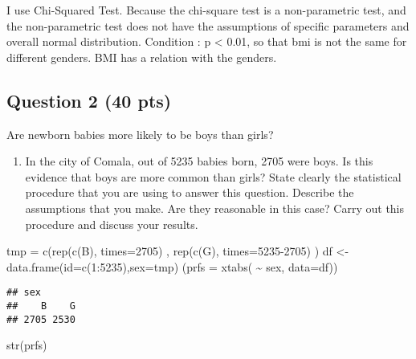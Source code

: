 \documentclass[
]{article}
\newenvironment{Shaded}{\begin{snugshade}}{\end{snugshade}}
\newcommand{\AttributeTok}[1]{\textcolor[rgb]{0.77,0.63,0.00}{#1}}
\newcommand{\DecValTok}[1]{\textcolor[rgb]{0.00,0.00,0.81}{#1}}
\newcommand{\FunctionTok}[1]{\textcolor[rgb]{0.00,0.00,0.00}{#1}}
\newcommand{\NormalTok}[1]{#1}
\newcommand{\OtherTok}[1]{\textcolor[rgb]{0.56,0.35,0.01}{#1}}
\newcommand{\SpecialCharTok}[1]{\textcolor[rgb]{0.00,0.00,0.00}{#1}}
\newcommand{\StringTok}[1]{\textcolor[rgb]{0.31,0.60,0.02}{#1}}
\providecommand{\tightlist}{%
  \setlength{\itemsep}{0pt}\setlength{\parskip}{0pt}}
\begin{document}
I use Chi-Squared Test. Because the chi-square test is a non-parametric
test, and the non-parametric test does not have the assumptions of
specific parameters and overall normal distribution. Condition : p
\textless{} 0.01, so that bmi is not the same for different genders. BMI
has a relation with the genders.

\hypertarget{question-2-40-pts}{%
\subsection{Question 2 (40 pts)}\label{question-2-40-pts}}

Are newborn babies more likely to be boys than girls?

\begin{enumerate}
\def\labelenumi{(\alph{enumi})}
\tightlist
\item
  In the city of Comala, out of 5235 babies born, 2705 were boys. Is
  this evidence that boys are more common than girls? State clearly the
  statistical procedure that you are using to answer this question.
  Describe the assumptions that you make. Are they reasonable in this
  case? Carry out this procedure and discuss your results.
\end{enumerate}

\begin{Shaded}
\begin{Highlighting}[]
\NormalTok{tmp }\OtherTok{=} \FunctionTok{c}\NormalTok{(}\FunctionTok{rep}\NormalTok{(}\FunctionTok{c}\NormalTok{(}\StringTok{\textquotesingle{}B\textquotesingle{}}\NormalTok{), }\AttributeTok{times=}\DecValTok{2705}\NormalTok{) , }\FunctionTok{rep}\NormalTok{(}\FunctionTok{c}\NormalTok{(}\StringTok{\textquotesingle{}G\textquotesingle{}}\NormalTok{), }\AttributeTok{times=}\DecValTok{5235{-}2705}\NormalTok{) )}
\NormalTok{df }\OtherTok{\textless{}{-}} \FunctionTok{data.frame}\NormalTok{(}\AttributeTok{id=}\FunctionTok{c}\NormalTok{(}\DecValTok{1}\SpecialCharTok{:}\DecValTok{5235}\NormalTok{),}\AttributeTok{sex=}\NormalTok{tmp)}
\NormalTok{(}\AttributeTok{prfs =} \FunctionTok{xtabs}\NormalTok{( }\SpecialCharTok{\textasciitilde{}}\NormalTok{ sex, }\AttributeTok{data=}\NormalTok{df))}
\end{Highlighting}
\end{Shaded}

\begin{verbatim}
## sex
##    B    G 
## 2705 2530
\end{verbatim}

\begin{Shaded}
\begin{Highlighting}[]
\FunctionTok{str}\NormalTok{(prfs)}
\end{Highlighting}
\end{Shaded}
\end{document}
